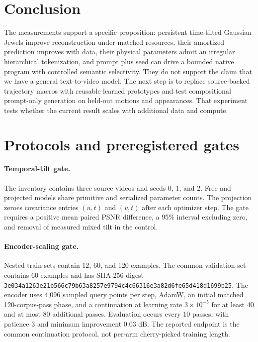 \documentclass{article}
\begin{document}
\section{Conclusion}

The measurements support a specific proposition: persistent time-tilted Gaussian Jewels improve
reconstruction under matched resources, their amortized prediction improves with data, their
physical parameters admit an irregular hierarchical tokenization, and prompt plus seed can drive a
bounded native program with controlled semantic selectivity. They do not support the claim that we
have a general text-to-video model. The next step is to replace source-backed trajectory macros with
reusable learned prototypes and test compositional prompt-only generation on held-out motions and
appearances. That experiment tests whether the current result scales with additional data and
compute.




\appendix

\section{Protocols and preregistered gates}
\label{app:protocols}

\paragraph{Temporal-tilt gate.}
The inventory contains three source videos and seeds 0, 1, and 2. Free and projected models share
primitive and serialized parameter counts. The projection zeroes covariance entries $(u,t)$ and
$(v,t)$ after each optimizer step. The gate requires a positive mean paired PSNR difference, a 95\%
interval excluding zero, and removal of measured mixed tilt in the control.

\paragraph{Encoder-scaling gate.}
Nested train sets contain 12, 60, and 120 examples. The common validation set contains 60 examples
and has SHA-256 digest
\texttt{3e034a1263e21b566c79b63a8257e9794c4c66316e3a82d6fe65d418d1699b25}.
The encoder uses 4,096 sampled query points per step, AdamW, an initial matched 120-corpus-pass phase,
and a continuation at learning rate $3\times10^{-5}$ for at least 40 and at most 80 additional
passes. Evaluation occurs every 10 passes, with patience 3 and minimum improvement 0.03 dB. The
reported endpoint is the common continuation protocol, not per-arm cherry-picked training length.
\end{document}
